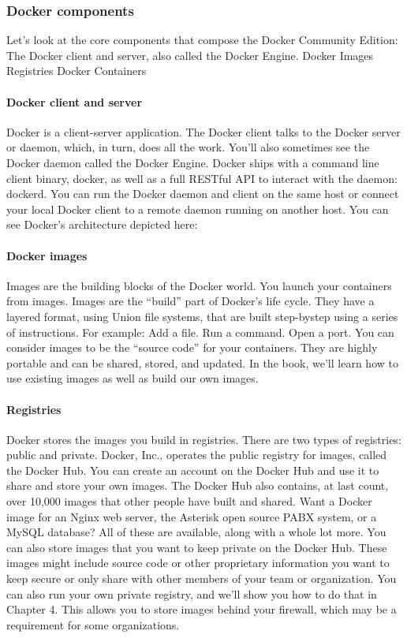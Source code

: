 \subsubsection{Docker components}
Let’s look at the core components that compose the Docker Community
Edition:
The Docker client and server, also called the Docker Engine.
Docker Images
Registries
Docker Containers
\paragraph{Docker client and server}
Docker is a client-server application. The Docker client talks to the Docker
server or daemon, which, in turn, does all the work. You’ll also sometimes
see the Docker daemon called the Docker Engine. Docker ships with a
command line client binary, docker, as well as a full RESTful API to
interact with the daemon: dockerd. You can run the Docker daemon and
client on the same host or connect your local Docker client to a remote
daemon running on another host. You can see Docker’s architecture
depicted here:
\paragraph{Docker images}
Images are the building blocks of the Docker world. You launch your
containers from images. Images are the “build” part of Docker’s life cycle.
They have a layered format, using Union file systems, that are built step-bystep using a series of instructions. For example:
Add a file.
Run a command.
Open a port.
You can consider images to be the “source code” for your containers. They
are highly portable and can be shared, stored, and updated. In the book,
we’ll learn how to use existing images as well as build our own images.
\paragraph{Registries}
Docker stores the images you build in registries. There are two types of
registries: public and private. Docker, Inc., operates the public registry for
images, called the Docker Hub. You can create an account on the Docker
Hub and use it to share and store your own images.
The Docker Hub also contains, at last count, over 10,000 images that other
people have built and shared. Want a Docker image for an Nginx web
server, the Asterisk open source PABX system, or a MySQL database? All
of these are available, along with a whole lot more.
You can also store images that you want to keep private on the Docker Hub.
These images might include source code or other proprietary information
you want to keep secure or only share with other members of your team or
organization.
You can also run your own private registry, and we’ll show you how to do
that in Chapter 4. This allows you to store images behind your firewall,
which may be a requirement for some organizations.
